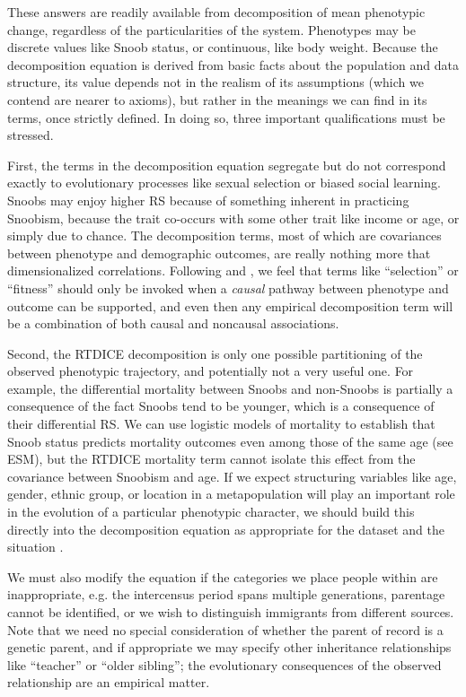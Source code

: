 \documentclass[11pt]{article}
\begin{document}
These answers are readily available from decomposition of mean phenotypic change, regardless of the particularities of the system.  Phenotypes may be discrete values like Snoob status, or continuous, like body weight.  Because the decomposition equation is derived from basic facts about the population and data structure, its value depends not in the realism of its assumptions (which we contend are nearer to axioms), but rather in the meanings we can find in its terms, once strictly defined.  In doing so, three important qualifications must be stressed. 

First, the terms in the decomposition equation segregate but do not correspond exactly to evolutionary processes like sexual selection or biased social learning.  Snoobs may enjoy higher RS because of something inherent in practicing Snoobism, because the trait co-occurs with some other trait like income or age, or simply due to chance. The decomposition terms, most of which are covariances between phenotype and demographic outcomes, are really nothing more that dimensionalized correlations.  Following \cite{rice2004evolutionary} and \cite{henrich2008five}, we feel that terms like ``selection'' or ``fitness'' should only be invoked when a \textit{causal} pathway between phenotype and outcome can be supported, and even then any empirical decomposition term will be a combination of both causal and noncausal associations. 

Second, the RTDICE decomposition is only one possible partitioning of the observed phenotypic trajectory, and potentially not a very useful one.  For example, the differential mortality between Snoobs and non-Snoobs is partially a consequence of the fact Snoobs tend to be younger, which is a consequence of their differential RS.  We can use logistic models of mortality to establish that Snoob status predicts mortality outcomes even among those of the same age (see ESM), but the RTDICE mortality term cannot isolate this effect from the covariance between Snoobism and age.  If we expect structuring variables like age, gender, ethnic group, or location in a metapopulation will play an important role in the evolution of a particular phenotypic character, we should build this directly into the decomposition equation as appropriate for the dataset and the situation \citep{coulson2008dynamics}.  

We must also modify the equation if the categories we place people within are inappropriate, e.g. the intercensus period spans multiple generations, parentage cannot be identified, or we wish to distinguish immigrants from different sources.  Note that we need no special consideration of whether the parent of record is a genetic parent, and if appropriate we may specify other inheritance relationships like ``teacher'' or ``older sibling''; the evolutionary consequences of the observed relationship are an empirical matter.
\end{document}
